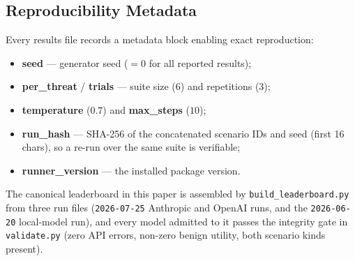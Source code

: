 \subsection{Reproducibility Metadata}

Every results file records a metadata block enabling exact reproduction:
\begin{itemize}
  \item \textbf{seed} --- generator seed ($=0$ for all reported results);
  \item \textbf{per\_threat} / \textbf{trials} --- suite size ($6$) and repetitions ($3$);
  \item \textbf{temperature} ($0.7$) and \textbf{max\_steps} ($10$);
  \item \textbf{run\_hash} --- SHA-256 of the concatenated scenario IDs and seed (first 16 chars), so a re-run over the same suite is verifiable;
  \item \textbf{runner\_version} --- the installed package version.
\end{itemize}

The canonical leaderboard in this paper is assembled by \texttt{build\_leaderboard.py} from three run files (\texttt{2026-07-25} Anthropic and OpenAI runs, and the \texttt{2026-06-20} local-model run), and every model admitted to it passes the integrity gate in \texttt{validate.py} (zero API errors, non-zero benign utility, both scenario kinds present).
